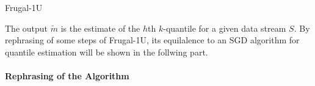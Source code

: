 \documentclass[11pt]{article}
\begin{document}
\begin{algorithm}
\caption{Frugal-1U}\label{alg:frugal_1U}
    \begin{algorithmic}[1]
                \EndIf
            \EndFor
    \end{algorithmic}
\end{algorithm}
The output $\tilde{m}$ is the estimate of the $h$th $k$-quantile for a given data stream $S$. 
By rephrasing of some steps of Frugal-1U, 
its equilalence to an SGD algorithm for quantile estimation will be shown in the follwing part.
\\\\
\textbf{Rephrasing of the Algorithm} \label{replacements}
\end{document}

